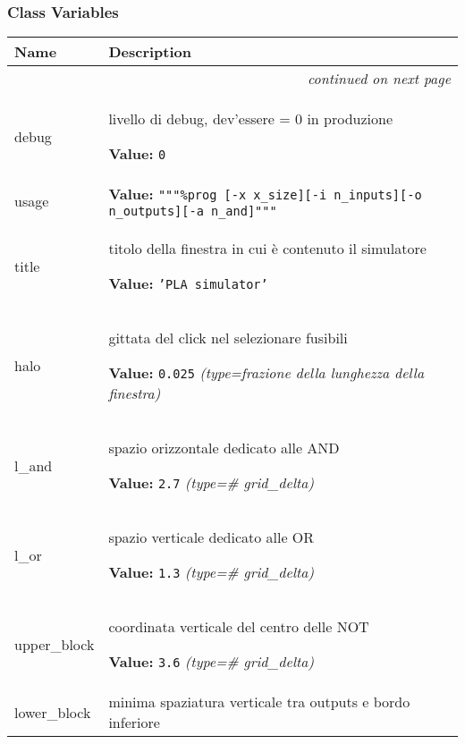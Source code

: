 
  \subsubsection{Class Variables}

    \vspace{-1cm}
\hspace{\varindent}\begin{longtable}{|p{\varnamewidth}|p{\vardescrwidth}|l}
\cline{1-2}
\cline{1-2} \centering \textbf{Name} & \centering \textbf{Description}& \\
\cline{1-2}
\endhead\cline{1-2}\multicolumn{3}{r}{\small\textit{continued on next page}}\\\endfoot\cline{1-2}
\endlastfoot\raggedright d\-e\-b\-u\-g\- & \raggedright livello di debug, dev'essere = 0 in produzione

\textbf{Value:} 
{\tt 0}&\\
\cline{1-2}
\raggedright u\-s\-a\-g\-e\- & \raggedright \textbf{Value:} 
{\tt """\%prog [-x x\_size][-i n\_inputs][-o n\_outputs][-a n\_and]"""}&\\
\cline{1-2}
\raggedright t\-i\-t\-l\-e\- & \raggedright titolo della finestra in cui è contenuto il simulatore

\textbf{Value:} 
{\tt 'PLA simulator'}&\\
\cline{1-2}
\raggedright h\-a\-l\-o\- & \raggedright gittata del click nel selezionare fusibili

\textbf{Value:} 
{\tt 0.025}            {\it (type=frazione della lunghezza della finestra)}&\\
\cline{1-2}
\raggedright l\-\_\-a\-n\-d\- & \raggedright spazio orizzontale dedicato alle AND

\textbf{Value:} 
{\tt 2.7}            {\it (type=\# grid\_delta)}&\\
\cline{1-2}
\raggedright l\-\_\-o\-r\- & \raggedright spazio verticale dedicato alle OR

\textbf{Value:} 
{\tt 1.3}            {\it (type=\# grid\_delta)}&\\
\cline{1-2}
\raggedright u\-p\-p\-e\-r\-\_\-b\-l\-o\-c\-k\- & \raggedright coordinata verticale del centro delle NOT

\textbf{Value:} 
{\tt 3.6}            {\it (type=\# grid\_delta)}&\\
\cline{1-2}
\raggedright l\-o\-w\-e\-r\-\_\-b\-l\-o\-c\-k\- & \raggedright minima spaziatura verticale tra outputs e bordo inferiore


\end{longtable}
